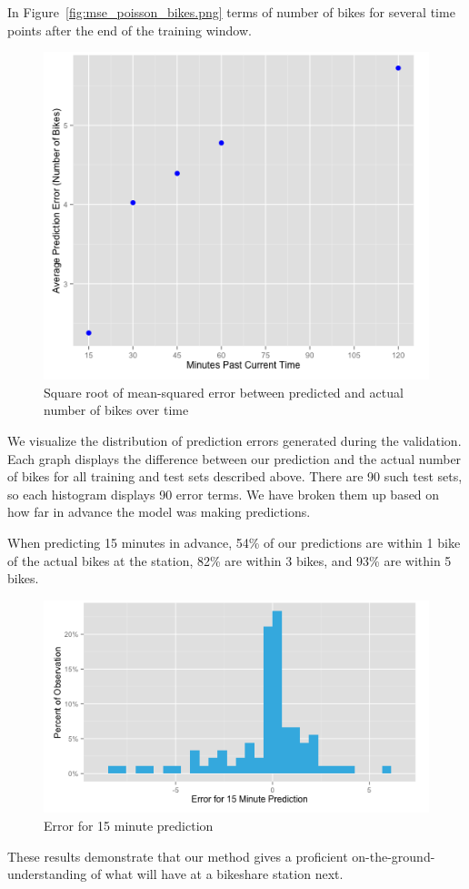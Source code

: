 \documentclass{acm_proc_article-sp}
\begin{document}
In Figure~\ref{fig:mse_poisson_bikes.png} terms of number of bikes for several time points after the end of the training window.
\begin{figure} [!h]
\caption{Square root of mean-squared error between predicted and actual number of bikes over time}
\centering
\includegraphics[scale = 0.4]{mse_poisson_bikes.png}
\end{figure}

We visualize the distribution of prediction errors generated during the validation. Each graph displays the difference between our prediction and the actual number of bikes for all training and test sets described above. There are 90 such test sets, so each histogram displays 90 error terms. We have broken them up based on how far in advance the model was making predictions.

When predicting 15 minutes in advance, 54\% of our predictions are within 1 bike of the actual bikes at the station, 82\% are within 3 bikes, and 93\% are within 5 bikes.
\begin{figure} [!h]
\caption{Error for 15 minute prediction}
\centering
\includegraphics[scale = 0.4]{Error_for_15_Minute.png}
\end{figure}
These results demonstrate that our method gives a proficient on-the-ground-understanding of what will have at a bikeshare station next.
\end{document}
